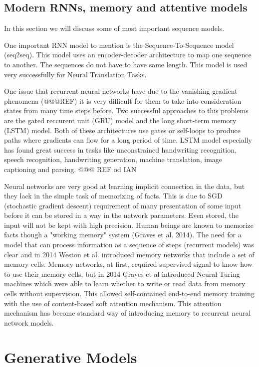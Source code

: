 \documentclass[b5paper]{book}
\begin{document}
\subsection{Modern RNNs, memory and attentive models}

In this section we will discuss some of most important sequence models.

One important RNN model to mention is the Sequence-To-Sequence model (seq2seq). This model uses an encoder-decoder architecture to map one sequence to another. The sequences do not have to have same length. This model is used very successfully for Neural Translation Tasks.

One issue that recurrent neural networks have due to the vanishing gradient phenomena (@@@REF) it is very difficult for them to take into consideration states from many time steps before. Two successful approaches to this problems are the gated reccurent unit (GRU) model and the long short-term memory (LSTM) model. Both of these architectures use gates or self-loops to produce paths where gradients can flow for a long period of time. LSTM model especially has found great success in tasks like unconstrained handwriting recognition, speech recognition, handwriting generation, machine translation, image captioning and parsing. @@@ REF od IAN

Neural networks are very good at learning implicit connection in the data, but they lack in the simple task of memorizing of facts. This is due to SGD (stochastic gradient descent) requirement of many presentation of some input before it can be stored in a way in the network parameters. Even stored, the input will not be kept with high precision. Human beings are known to memorize facts though a "working memory" system (Graves et al. 2014). The need for a model that can process information as a sequence of steps (recurrent models) was clear and in 2014 Weston et al. introduced memory networks that include a set of memory cells. Memory networks, at first, required supervised signal to know how to use their memory cells, but in 2014 Graves et al introduced Neural Turing machines which were able to learn whether to write or read data from memory cells without supervision. This allowed self-contained end-to-end memory training with the use of content-based soft attention mechanism. This attention mechanism has become standard way of introducing memory to recurrent neural network models.

\section{Generative Models}
\end{document}
